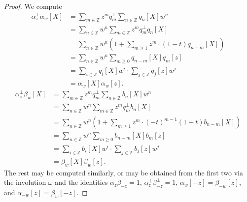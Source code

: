 \documentclass[12pt]{amsart}%
\theoremstyle{remark}
\theoremstyle{definition}
\newcommand{\Z}{\mathbb{Z}}
\begin{document}
    \begin{proof}
        We compute
        \begin{align*}
            \alpha_z^\perp \alpha_w[X]&=\sum_{m\in\Z}z^mq_m^\perp\sum_{n\in\Z}q_n[X]w^n\\
            &=\sum_{n\in\Z}w^n\sum_{m\in\Z}z^m q_m^\perp q_n[X]\\
            &=\sum_{n\in\Z}w^n\left(1+\sum_{m\geq1}z^m\cdot(1-t)q_{n-m}[X]\right)\\
            &=\sum_{n\in\Z}w^n\sum_{m\geq0}q_{n-m}[X]q_m[z]\\
            &=\sum_{i\in\Z}q_i[X]w^i\cdot \sum_{j\in\Z}q_j[z]w^j\\
            &=\alpha_w[X]\alpha_w[z].
        \end{align*}
        \begin{align*}
            \alpha_z^\perp \beta_w[X]&=\sum_{m\in\Z}z^mq_m^\perp\sum_{n\in\Z}b_n[X]w^n\\
            &=\sum_{n\in\Z}w^n\sum_{m\in\Z}z^m q_m^\perp b_n[X]\\
            &=\sum_{n\in\Z}w^n\left(1+\sum_{m\geq1}z^m\cdot(-t)^{m-1}(1-t)b_{n-m}[X]\right)\\
            &=\sum_{n\in\Z}w^n\sum_{m\geq0}b_{n-m}[X]b_m[z]\\
            &=\sum_{i\in\Z}b_i[X]w^i\cdot \sum_{j\in\Z}b_j[z]w^j\\
            &=\beta_w[X]\beta_w[z].
        \end{align*}
        The rest may be computed similarly, or may be obtained from the first two via the involution $\omega$ and the identities $\alpha_z\beta_{-z}=1$, $\alpha_z^\perp\beta_{-z}^\perp=1$, $\alpha_w[-z]=\beta_{-w}[z]$, and $\alpha_{-w}[z]=\beta_w[-z]$.

\end{proof}
\end{document}
